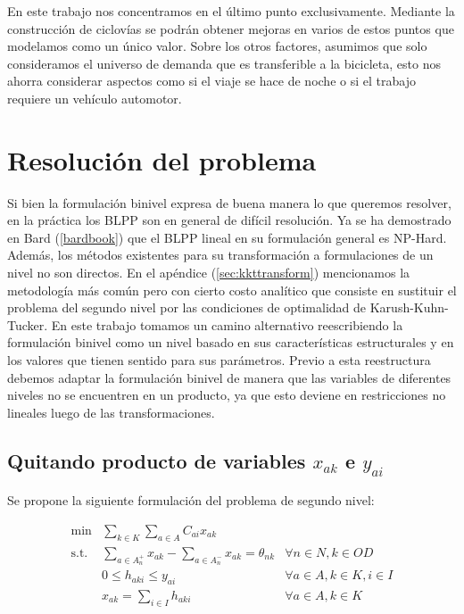\documentclass{article}
\begin{document}
  En este trabajo nos concentramos en el último punto exclusivamente. Mediante la construcción de ciclovías se podrán obtener mejoras en varios de estos puntos que modelamos como un único valor. Sobre los otros factores, asumimos que solo consideramos el universo de demanda que es transferible a la bicicleta, esto nos ahorra considerar aspectos como si el viaje se hace de noche o si el trabajo requiere un vehículo automotor.

  \section{Resolución del problema}

  Si bien la formulación binivel expresa de buena manera lo que queremos resolver, en la práctica los BLPP son en general de difícil resolución. Ya se ha demostrado en Bard (\ref{bardbook}) que el BLPP lineal en su formulación general es NP-Hard. Además, los métodos existentes para su transformación a formulaciones de un nivel no son directos. En el apéndice (\ref{sec:kkttransform}) mencionamos la metodología más común pero con cierto costo analítico que consiste en sustituir el problema del segundo nivel por las condiciones de optimalidad de Karush-Kuhn-Tucker. En este trabajo tomamos un camino alternativo reescribiendo la formulación binivel como un nivel basado en sus características estructurales y en los valores que tienen sentido para sus parámetros. Previo a esta reestructura debemos adaptar la formulación binivel de manera que las variables de diferentes niveles no se encuentren en un producto, ya que esto deviene en restricciones no lineales luego de las transformaciones.

  \subsection{Quitando producto de variables $x_{ak}$ e $y_{ai}$}

  Se propone la siguiente formulación del problema de segundo nivel:

  \begin{align}
    \text{min}  & \sum_{k \in K} \sum_{a \in A} C_{ai} x_{ak}         & \label{eq:subproblemrefeq1} \\
    \text{s.t.} & \sum_{a \in A_n^+} x_{ak} - \sum_{a \in A_n^-} x_{ak} = \theta_{nk} & \forall n \in N, k \in OD \\
                & 0 \leq h_{aki} \leq y_{ai}                                          & \forall a \in A, k \in K, i \in I \\
                & x_{ak} = \sum_{i \in I} h_{aki}                                     & \forall a \in A, k \in K \label{eq:subproblemrefeq4}
  \end{align}
\end{document}
